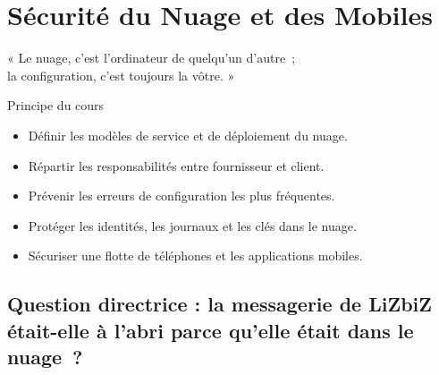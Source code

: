 
\chapter{Sécurité du Nuage et des Mobiles}
\label{chap:nuage}

\epigraph{%
    « Le nuage, c'est l'ordinateur de quelqu'un d'autre~;\\
    la configuration, c'est toujours la vôtre. »%
}{Principe du cours}


\begin{boxobjectifs}
\begin{itemize}
    \item Définir les modèles de service et de déploiement du nuage.
    \item Répartir les responsabilités entre fournisseur et client.
    \item Prévenir les erreurs de configuration les plus fréquentes.
    \item Protéger les identités, les journaux et les clés dans le nuage.
    \item Sécuriser une flotte de téléphones et les applications mobiles.
\end{itemize}
\end{boxobjectifs}

\bigskip

\section*{Question directrice : la messagerie de LiZbiZ était-elle à l'abri parce qu'elle était dans le nuage~?}


